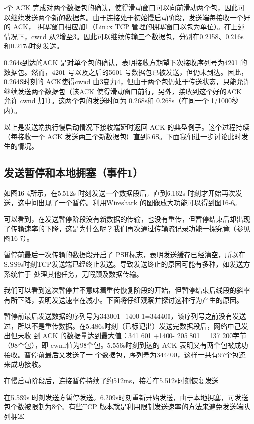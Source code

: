 -个 ACK 完成对两个数据包的确认，使得滑动窗口可以向前滑动两个包，因此可以继续发送两个新的数据包。由于连接处于初始慢启动阶段，发送端每接收一个好的 ACK，
拥塞窗口相应加1（Linux TCP 管理的拥塞窗口以包为单位）。在上述情况下，cwnd 从2增至3。因此可以继续传输三个数据包，分别在0.2158、0.216s 和0.217s时刻发送。

0.264s到达的ACK 是对单个包的确认，表明接收方期望下次接收序列号为4201 的数据包。然而，4201 号以及之后的5601 号数据包已被发送，但仍未到达。因此，0.264S时刻的
ACK使得cwnd 由3变力4，但由于两个包仍处于传送状态，只能允许继续发送两个数据包（该ACK 使得滑动窗口前行，另外，接收到这个好的ACK 允许
cwnd 加1）。这两个包的发送时间为 0.268s和 0.268s（在同一个 1/1000秒内）。

以上是发送端执行慢启动情况下接收端延时返回 ACK 的典型例子。这个过程持续（每接收一个 ACK 发送两三个新数据包）直到5.6S。下面我们进一步讨论此时发生的情况。

\subsection{发送暂停和本地拥塞（事件1）}

如图16-4所示，在5.512s 时刻发送一个数据段后，直到6.162s 时刻才开始再次发送，这中间出现了一个暂停。利用Wireshark 的图像放大功能可以得到图16-6。

可以看到，在发送暂停阶段没有新数据的传输，也没有重传，但暂停结束后却出现了传输速率的下降，这是为什么呢？我们再次通过传输流记录功能一探究竟（参见图16-7）。

暂停前最后一次传输的数据段开启了 PSH标志，表明发送缓存已经清空，所以在S.SS9s时刻TCP发送端已经终止发送。导致发送终止的原因可能有多种，如发送方系统忙于
处理其他任务，无暇顾及数据传输。

我们可以看到这次暂停并不意味着重传恢复阶段的开始，但暂停结束后线段的斜率有所下降，表明发送速率在减小。下面将仔细观察并探讨这种行为产生的原因。

暂停前最后发送数据的序列号为343001+1400-1=344400，该序列号之前没有发送过，所以不是重传数据。在5.486s时刻（已标记出）发送完数据段后，网络中己发出但未收
到 ACK 的数据量达到最大值：341 601 +1400- 205 801 = 137 200字节（98个包），即 cwnd值为98个包。5.556s时刻到达的 ACK 表明又有两个包被成功接收。暂停前最后又发送了一
个数据包，序列号为344400，这样一共有97个包还来成功接收。

在慢启动阶段后，连接暂停持续了约512ms，接着在5.512s时刻恢复发送

在5.5S9s 时刻发送方暂停发送。6.209s时刻重新开始发送，由于本地拥塞，可发送包个数被限制为8个。有些TCP 版本就是利用限制发送速率的方法来避免发送端队列拥塞

